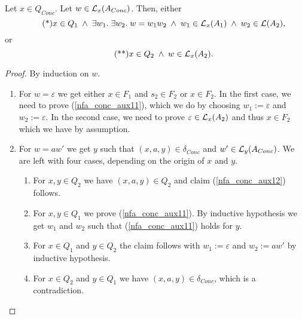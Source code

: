 \begin{lemma}
    \label{nfa_conc_aux1}
    Let $x \in Q_{Conc}$. Let $w \in \mathcal{L}_{x}(A_{Conc})$. Then, either
    \begin{equation}
        \tag{*}
        \label{nfa_conc_aux11}
        x \in Q_1 \; \wedge \; \exists w_1. \; \exists w_2. \; w = w_1 w_2 \; \wedge \; w_1 \in \mathcal{L}_{x}(A_1) \; \wedge \; w_2 \in \mathcal{L}(A_2),
    \end{equation}
    or
    \begin{equation}
        \tag{**}
        \label{nfa_conc_aux12}
        x \in Q_2 \; \wedge \; w \in \mathcal{L}_{x}(A_2).
    \end{equation}
\end{lemma}
\begin{proof}
    By induction on $w$. 
    \begin{enumerate}
        \item For $w = \varepsilon$ we get either $x \in F_1$ and $s_2 \in F_2$ or $x \in F_2$.
            In the first case, we need to prove (\ref{nfa_conc_aux11}), which we do by choosing $w_1 := \varepsilon$ and $w_2 := \varepsilon$.
            In the second case, we need to prove $\varepsilon \in \mathcal{L}_{x}(A_2)$ and thus $x \in F_2$ which we have by assumption.
        \item For $w = aw'$ we get $y$ such that $(x,a,y) \in \delta_{Conc}$ and $w' \in \mathcal{L}_{y}(A_{Conc})$. 
            We are left with four cases, depending on the origin of $x$ and $y$.
            \begin{enumerate}
                \item For $x,y \in Q_2$ we have $(x,a,y) \in Q_2$ and claim (\ref{nfa_conc_aux12}) follows.
                \item For $x,y \in Q_1$ we prove (\ref{nfa_conc_aux11}). 
                    By inductive hypothesis we get $w_1$ and $w_2$ such that (\ref{nfa_conc_aux11}) holds for $y$.
                \item For $x \in Q_1$ and $y \in Q_2$ the claim follows with $w_1 := \varepsilon$ and $w_2 := aw'$ by inductive hypothesis.
                \item For $x \in Q_2$ and $y \in Q_1$ we have $(x, a, y) \in \delta_{Conc}$, which is a contradiction.
            \end{enumerate}
    \end{enumerate}
\end{proof}


